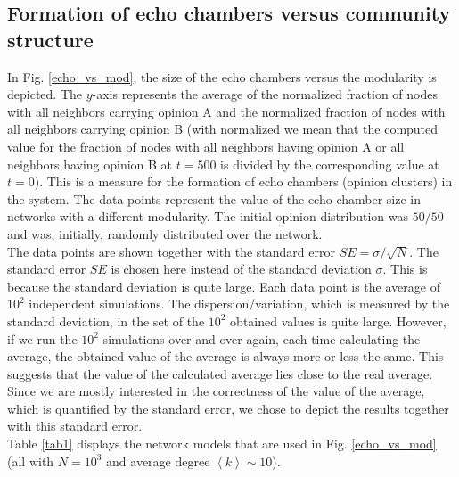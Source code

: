 \documentclass[11 pt , letterpaper , twoside , openright]{book}
\begin{document}

\subsection{Formation of echo chambers versus community structure}\label{echoVSmod}

In Fig. \ref{echo_vs_mod}, the size of the echo chambers versus the modularity is depicted. The $y$-axis represents the average of the normalized fraction of nodes with all neighbors carrying opinion A and the normalized fraction of nodes with all neighbors carrying opinion B (with normalized we mean that the computed value for the fraction of nodes with all neighbors having opinion A or all neighbors having opinion B at $t=500$ is divided by the corresponding value at $t=0$). This is a measure for the formation of echo chambers (opinion clusters) in the system. The data points represent the value of the echo chamber size in networks with a different modularity. The initial opinion distribution was $50/50$ and was, initially, randomly distributed over the network. \\
\newline
The data points are shown together with the standard error $SE = \sigma /\sqrt{N}$. The standard error $SE$ is chosen here instead of the standard deviation $\sigma$. This is because the standard deviation is quite large. Each data point is the average of $10^2$ independent simulations. The dispersion/variation, which is measured by the standard deviation, in the set of the $10^2$ obtained values is quite large. However, if we run the $10^2$ simulations over and over again, each time calculating the average, the obtained value of the average is always more or less the same. This suggests that the value of the calculated average lies close to the real average. Since we are mostly interested in the correctness of the value of the average, which is quantified by the standard error, we chose to depict the results together with this standard error.\\
\newline
Table \ref{tab1} displays the network models that are used in Fig. \ref{echo_vs_mod} (all with $N = 10^3$ and average degree $\left<k\right> \sim 10$).
\end{document}
